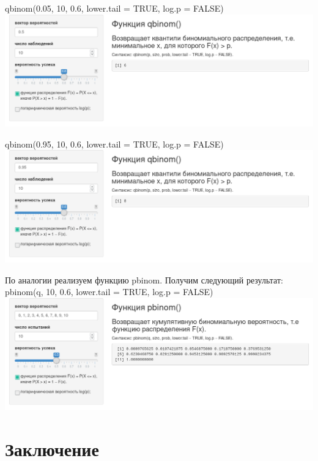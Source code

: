 \documentclass[14pt,a4paper]{scrartcl}
\begin{document}
    qbinom(0.05, 10, 0.6, lower.tail = TRUE, log.p = FALSE)\\
    
    \includegraphics[width=\textwidth]{qbinom.png}

    qbinom(0.95, 10, 0.6, lower.tail = TRUE, log.p = FALSE)\\

    \includegraphics[width=\textwidth]{qbinom-2.png}

    \newpage
    По аналогии реализуем функцию pbinom. Получим следующий результат:\\

    pbinom(q, 10, 0.6, lower.tail = TRUE, log.p = FALSE)\\

    \includegraphics[width=\textwidth]{pbinom-1.png}

    \newpage
    \section[Заключение]{Заключение}
\end{document}
